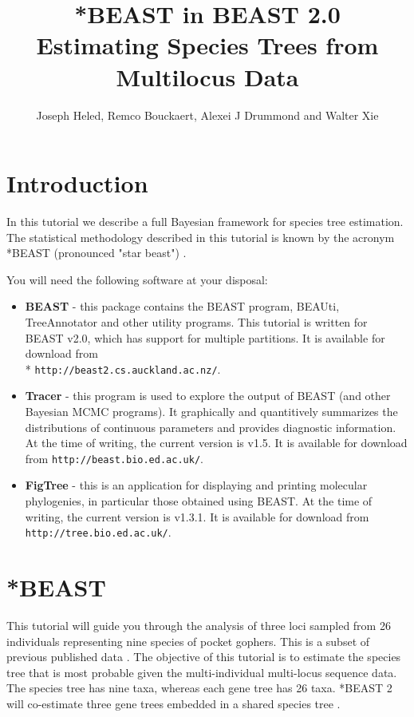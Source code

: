 \documentclass{article}
\newcommand{\BEASTVersion}{2.0}
\newcommand{\TracerVersion}{1.5}
\newcommand{\FigTreeVersion}{1.3.1}
\begin{document}
\title{*BEAST in BEAST 2.0\\
Estimating Species Trees from Multilocus Data}

\author{Joseph Heled, Remco Bouckaert, Alexei J Drummond and Walter Xie}

\maketitle

\section{Introduction}

In this tutorial we describe a full Bayesian framework for species tree estimation. The statistical methodology described in this tutorial is known by the acronym *BEAST (pronounced "star beast") \cite{Heled:2010fk}.

You will need the following software at your disposal:

\begin{itemize}

\item {\bf BEAST} - this package contains the BEAST program, BEAUti, TreeAnnotator and other utility programs. This tutorial is written for BEAST v{\BEASTVersion}, which has support for multiple partitions. It is available for download from \\* \texttt{http://beast2.cs.auckland.ac.nz/}.
\item {\bf Tracer} - this program is used to explore the output of BEAST (and other Bayesian MCMC programs). It graphically and
quantitively summarizes the distributions of continuous parameters and provides diagnostic information. At the time of
writing, the current version is v{\TracerVersion}. It is available for download from \texttt{http://beast.bio.ed.ac.uk/}.
\item {\bf FigTree} - this is an application for displaying and printing molecular phylogenies, in particular those obtained using
BEAST. At the time of writing, the current version is v{\FigTreeVersion}. It is available for download from \texttt{http://tree.bio.ed.ac.uk/}.
\end{itemize}

\section{*BEAST}

This tutorial will guide you through the analysis of three loci sampled from 26 individuals representing nine species of pocket gophers. This is a subset of previous published data \cite{belfiore2008multilocus}. The objective of this tutorial is to estimate the species tree that is most probable given the multi-individual multi-locus sequence data. The species tree has nine taxa, whereas each gene tree has 26 taxa. *BEAST 2 will co-estimate three gene trees embedded in a shared species tree \cite[for details]{Heled:2010fk}.
\end{document}
